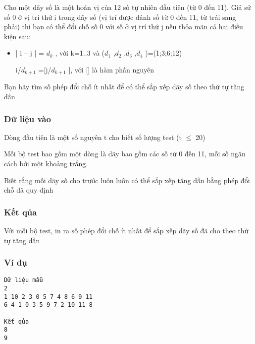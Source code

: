 



   Cho một dãy số là một hoán vị của 12 số tự nhiên đầu tiên (từ 0 đến 11). Giả sử số 0 ở vị trí thứ i trong dãy số (vị trí được đánh số từ 0 đến 11, từ trái sang phải) thì bạn có thể đổi chỗ số 0 với số ở vị trí thứ j nếu thỏa mãn cả hai điều kiện sau:  
\begin{itemize}
	\item     | i – j | = $d_{k}$    , với k=1..3 và ($d_{1}$    ,$d_{2}$    ,$d_{3}$    ,$d_{4}$    )=(1;3;6;12)    


	\item     [i/$d_{k+1}$    ]=[j/$d_{k+1}$    ], với [] là hàm phần nguyên   
\end{itemize}

   Bạn hãy tìm số phép đổi chỗ ít nhất để có thể sắp xếp dãy số theo thứ tự tăng dần  

\subsubsection{   Dữ liệu vào  }

   Dòng đầu tiên là một số nguyên t cho biết số lượng test (t $\le$ 20)  

   Mỗi bộ test bao gồm một dòng là dãy bao gồm các số từ 0 đến 11, mỗi số ngăn cách bởi một khoảng trắng.  

   Biết rằng mỗi dãy số cho trước luôn luôn có thể sắp xếp tăng dần bằng phép đổi chỗ đã quy định  

\subsubsection{   Kết qủa  }

   Với mỗi bộ test, in ra số phép đổi chỗ ít nhất để sắp xếp dãy số đã cho theo thứ tự tăng dần  

\subsubsection{   Ví dụ  }
\begin{verbatim}
Dữ liệu mẫu
2
1 10 2 3 0 5 7 4 8 6 9 11
6 4 1 0 3 5 9 7 2 10 11 8

Kết qủa
8
9
\end{verbatim}
